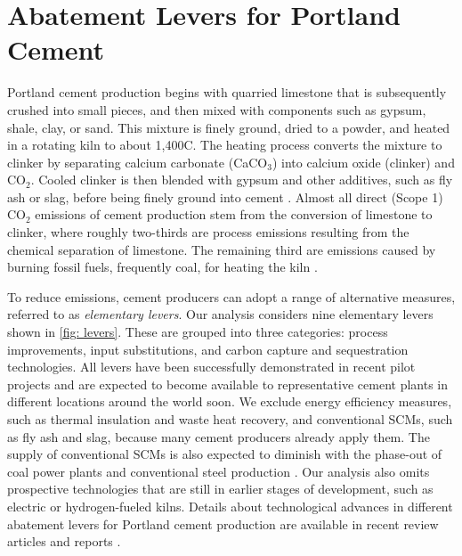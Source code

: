 \documentclass[12pt, a4paper]{article} %
\begin{document}
\section{Abatement Levers for Portland Cement}
\label{sec: application}

Portland cement production begins with quarried limestone that is subsequently crushed into small pieces, and then mixed with components such as gypsum, shale, clay, or sand. This mixture is finely ground, dried to a powder, and heated in a rotating kiln to about 1,400\degree C. The heating process converts the mixture to clinker by separating calcium carbonate (CaCO$_3$) into calcium oxide (clinker) and CO$_2$. Cooled clinker is then blended with gypsum and other additives, such as fly ash or slag, before being finely ground into cement \citep{fennell2021decarbonizing,schneider2011sustainable}. Almost all direct (Scope 1) CO$_2$ emissions of cement production stem from the conversion of limestone to clinker, where roughly two-thirds are process emissions resulting from the chemical separation of limestone. The remaining third are emissions caused by burning fossil fuels, frequently coal, for heating the kiln \citep{fennell2022going,schorcht2013best}.

To reduce emissions, cement producers can adopt a range of alternative measures, referred to as \emph{elementary levers}. Our analysis considers nine elementary levers shown in \autoref{fig: levers}. These are grouped into three categories: process improvements, input substitutions, and carbon capture and sequestration technologies. All levers have been successfully demonstrated in recent pilot projects and are expected to become available to representative cement plants in different locations around the world soon. We exclude energy efficiency measures, such as thermal insulation and waste heat recovery, and conventional SCMs, such as fly ash and slag, because many cement producers already apply them. The supply of conventional SCMs is also expected to diminish with the phase-out of coal power plants and conventional steel production \citep{juenger2019supplementary}. Our analysis also omits prospective technologies that are still in earlier stages of development, such as electric or hydrogen-fueled kilns. Details about technological advances in different abatement levers for Portland cement production are available in recent review articles and reports \citep{griffiths2023decarbonizing,napp2014a,rissman2020technologies,ecra2022state}.
\end{document}
